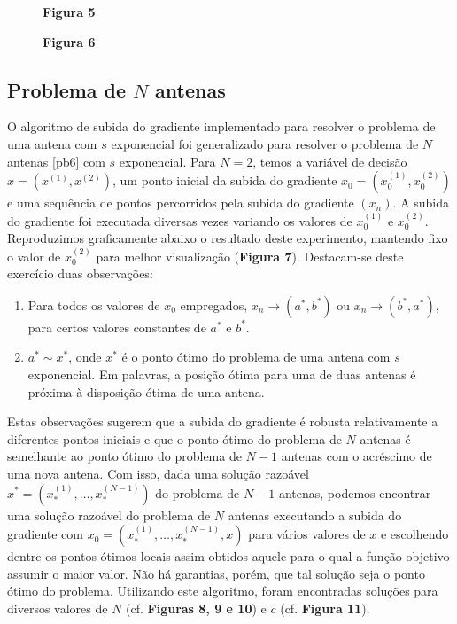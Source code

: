 \documentclass[a4paper,12pt]{article}
\begin{document}
\begin{figure}[h]
	\begin{center}
		
	\end{center}
	\vspace{-0.4in}
	\caption*{\textbf{Figura 5}}
\end{figure}

\begin{figure}[h]
	\begin{center}
		
	\end{center}
	\vspace{-0.4in}
	\caption*{\textbf{Figura 6}}
\end{figure}

\subsection{Problema de $N$ antenas}

O algoritmo de subida do gradiente implementado para resolver o problema de uma antena com $s$ exponencial foi generalizado para resolver o problema de $N$ antenas \eqref{pb6} com $s$ exponencial. Para $N = 2$, temos a variável de decisão $x = \left(x^{(1)}, x^{(2)}\right)$, um ponto inicial da subida do gradiente $x_0 = \left(x^{(1)}_0, x^{(2)}_0\right)$ e uma sequência de pontos percorridos pela subida do gradiente $(x_n)$. A subida do gradiente foi executada diversas vezes variando os valores de $x^{(1)}_0$ e $x^{(2)}_0$. Reproduzimos graficamente abaixo o resultado deste experimento, mantendo fixo o valor de $x^{(2)}_0$ para melhor visualização (\textbf{Figura 7}). Destacam-se deste exercício duas observações:
\begin{enumerate}[label = (\roman*)]
	\item Para todos os valores de $x_0$ empregados, $x_n \rightarrow (a^*,b^*)$ ou $x_n \rightarrow (b^*,a^*)$, para certos valores constantes de $a^*$ e $b^*$.
	\item $a^* \sim x^*$, onde $x^*$ é o ponto ótimo do problema de uma antena com $s$ exponencial. Em palavras, a posição ótima para uma de duas antenas é próxima à disposição ótima de uma antena.
\end{enumerate}
Estas observações sugerem que a subida do gradiente é robusta relativamente a diferentes pontos iniciais e que o ponto ótimo do problema de $N$ antenas é semelhante ao ponto ótimo do problema de $N-1$ antenas com o acréscimo de uma nova antena. Com isso, dada uma solução razoável $x^* = \left( x^{(1)}_*, \dots, x^{(N-1)}_* \right)$ do problema de $N-1$ antenas, podemos encontrar uma solução razoável do problema de $N$ antenas executando a subida do gradiente com $x_0 = \left( x^{(1)}_*, \dots, x^{(N-1)}_*, x \right)$ para vários valores de $x$ e escolhendo dentre os pontos ótimos locais assim obtidos aquele para o qual a função objetivo assumir o maior valor. Não há garantias, porém, que tal solução seja o ponto ótimo do problema. Utilizando este algoritmo, foram encontradas soluções para diversos valores de $N$ (cf. \textbf{Figuras 8, 9 e 10}) e $c$ (cf. \textbf{Figura 11}).
\end{document}
